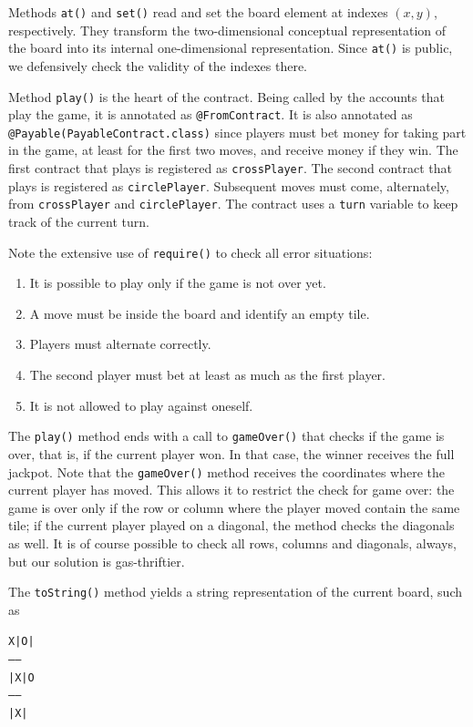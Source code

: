 Methods \texttt{at()} and \texttt{set()} read and set the board element
at indexes $(x,y)$, respectively. They transform the two-dimensional conceptual representation
of the board into its internal one-dimensional representation. Since \texttt{at()} is public,
we defensively check the validity of the indexes there.

Method \texttt{play()} is the heart of the contract. Being called by the accounts
that play the game, it is annotated as \texttt{@FromContract}. It is also annotated as
\texttt{@Payable(PayableContract.class)} since players must bet money for
taking part in the game, at least for the first two moves, and receive
money if they win. The first
contract that plays is registered as \texttt{crossPlayer}. The second contract
that plays is registered as \texttt{circlePlayer}. Subsequent moves must
come, alternately, from \texttt{crossPlayer} and \texttt{circlePlayer}. The contract
uses a \texttt{turn} variable to keep track of the current turn.

Note the extensive use of \texttt{require()} to check all error situations:
%
\begin{enumerate}
\item It is possible to play only if the game is not over yet.
\item A move must be inside the board and identify an empty tile.
\item Players must alternate correctly.
\item The second player must bet at least as much as the first player.
\item It is not allowed to play against oneself.
\end{enumerate}

The \texttt{play()} method ends with a call to \texttt{gameOver()} that checks
if the game is over, that is, if the current player won.
In that case, the winner receives the full
jackpot. Note that the \texttt{gameOver()} method receives the coordinates
where the current player has moved. This allows it to restrict the
check for game over: the game is over only if the row or column
where the player moved contain the same tile; if the current player
played on a diagonal, the method checks the diagonals as well.
It is of course possible to check all rows, columns and diagonals, always,
but our solution is gas-thriftier.

The \texttt{toString()} method yields a string representation of the current board, such as
%
\begin{alltt}
X|O| 
-----
 |X|O
-----
 |X| 
\end{alltt}

